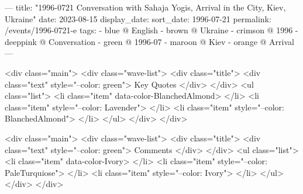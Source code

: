 ---
title: "1996-0721 Conversation with Sahaja Yogis, Arrival in the City, Kiev, Ukraine"
date: 2023-08-15
display_date: 
sort_date: 1996-07-21
permalink: /events/1996-0721-e
tags:
  - blue @ English
  - brown @ Ukraine
  - crimson @ 1996
  - deeppink @ Conversation
  - green @ 1996-07
  - maroon @  Kiev
  - orange @ Arrival
---

<div class="main">
  <div class="wave-list">
    <div class="title">
      <div class="text" style="--color: green">
        Key Quotes
      </div>
    </div>
    <ul class="list">
        <li class="item" data-color-BlanchedAlmond>
        </li>
        <li class="item" style="--color: Lavender">
        </li>
        <li class="item" style="--color: BlanchedAlmond">
        </li>
      </ul>
  </div>
</div>

<div class="main">
  <div class="wave-list">
    <div class="title">
      <div class="text" style="--color: green">
        Comments
      </div>
    </div>
    <ul class="list">
        <li class="item" data-color-Ivory>
        </li>
        <li class="item" style="--color: PaleTurquiose">
        </li>
        <li class="item" style="--color: Ivory">
        </li>
      </ul>
  </div>
</div>